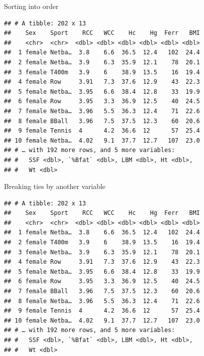 \documentclass[ignorenonframetext,]{beamer}
\newenvironment{Shaded}{\begin{snugshade}}{\end{snugshade}}
\newcommand{\KeywordTok}[1]{\textcolor[rgb]{0.13,0.29,0.53}{\textbf{#1}}}
\newcommand{\NormalTok}[1]{#1}
\newcommand{\OperatorTok}[1]{\textcolor[rgb]{0.81,0.36,0.00}{\textbf{#1}}}
\newcommand{\StringTok}[1]{\textcolor[rgb]{0.31,0.60,0.02}{#1}}
\begin{document}
\begin{frame}[fragile]{Sorting into order}
\protect\hypertarget{sorting-into-order}{}

\begin{Shaded}
\end{Shaded}

\begin{verbatim}
## # A tibble: 202 x 13
##    Sex    Sport    RCC   WCC    Hc    Hg  Ferr   BMI
##    <chr>  <chr>  <dbl> <dbl> <dbl> <dbl> <dbl> <dbl>
##  1 female Netba…  3.8    6.6  36.5  12.4   102  24.4
##  2 female Netba…  3.9    6.3  35.9  12.1    78  20.1
##  3 female T400m   3.9    6    38.9  13.5    16  19.4
##  4 female Row     3.91   7.3  37.6  12.9    43  22.3
##  5 female Netba…  3.95   6.6  38.4  12.8    33  19.9
##  6 female Row     3.95   3.3  36.9  12.5    40  24.5
##  7 female Netba…  3.96   5.5  36.3  12.4    71  22.6
##  8 female BBall   3.96   7.5  37.5  12.3    60  20.6
##  9 female Tennis  4      4.2  36.6  12      57  25.4
## 10 female Netba…  4.02   9.1  37.7  12.7   107  23.0
## # … with 192 more rows, and 5 more variables:
## #   SSF <dbl>, `%Bfat` <dbl>, LBM <dbl>, Ht <dbl>,
## #   Wt <dbl>
\end{verbatim}

\end{frame}

\begin{frame}[fragile]{Breaking ties by another variable}
\protect\hypertarget{breaking-ties-by-another-variable}{}

\begin{Shaded}
\end{Shaded}

\begin{verbatim}
## # A tibble: 202 x 13
##    Sex    Sport    RCC   WCC    Hc    Hg  Ferr   BMI
##    <chr>  <chr>  <dbl> <dbl> <dbl> <dbl> <dbl> <dbl>
##  1 female Netba…  3.8    6.6  36.5  12.4   102  24.4
##  2 female T400m   3.9    6    38.9  13.5    16  19.4
##  3 female Netba…  3.9    6.3  35.9  12.1    78  20.1
##  4 female Row     3.91   7.3  37.6  12.9    43  22.3
##  5 female Netba…  3.95   6.6  38.4  12.8    33  19.9
##  6 female Row     3.95   3.3  36.9  12.5    40  24.5
##  7 female BBall   3.96   7.5  37.5  12.3    60  20.6
##  8 female Netba…  3.96   5.5  36.3  12.4    71  22.6
##  9 female Tennis  4      4.2  36.6  12      57  25.4
## 10 female Netba…  4.02   9.1  37.7  12.7   107  23.0
## # … with 192 more rows, and 5 more variables:
## #   SSF <dbl>, `%Bfat` <dbl>, LBM <dbl>, Ht <dbl>,
## #   Wt <dbl>
\end{verbatim}

\end{frame}
\end{document}
